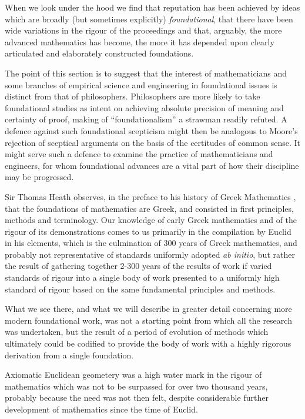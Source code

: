 \documentclass[10pt,titlepage]{book}
\begin{document}
When we look under the hood we find that reputation has been achieved by ideas which are broadly (but sometimes explicitly) \emph{foundational}, that there have been wide variations in the rigour of the proceedings and that, arguably, the more advanced mathematics has become, the more it has depended upon clearly articulated and elaborately constructed foundations.

The point of this section is to suggest that the interest of mathematicians and some branches of empirical science and engineering in foundational issues is distinct from that of philosophers.
Philosophers are more likely to take foundational studies as intent on achieving absolute precision of meaning and certainty of proof, making of ``foundationalism'' a strawman readily refuted.
A defence against such foundational scepticism might then be analogous to Moore's rejection of sceptical arguments on the basis of the certitudes of common sense.
It might serve such a defence to examine the practice of mathematicians and engineers, for whom foundational advances are a vital part of how their discipline may be progressed.

Sir Thomas Heath observes, in the preface to his history of Greek Mathematics \cite{heath1921}, that the foundations of mathematics are Greek, and consisted in first principles, methods and terminology.
Our knowledge of early Greek mathematics and of the rigour of its demonstrations comes to us primarily in the compilation by Euclid in his elements, which is the culmination of 300 years of Greek mathematics, and probably not representative of standards uniformly adopted \emph{ab initio}, but rather the result of gathering together 2-300 years of the results of work if varied standards of rigour into a single body of work presented to a uniformly high standard of rigour based on the same fundamental principles and methods.

What we see there, and what we will describe in greater detail concerning more modern foundational work, was not a starting point from which all the research was undertaken, but the result of a period of evolution of methods which ultimately could be codified to provide the body of work with a highly rigorous derivation from a single  foundation.

Axiomatic Euclidean geometery was a high water mark in the rigour of mathematics which was not to be surpassed for over two thousand years, probably because the need was not then felt, despite considerable further development of mathematics since the time of Euclid.
\end{document}
